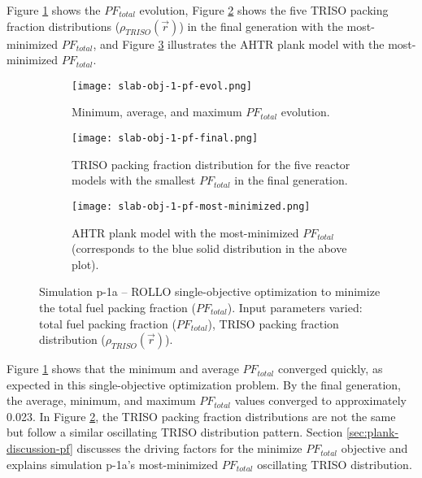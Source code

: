 Figure \ref{fig:slab-obj-1-pf-evol} shows the $PF_{total}$ evolution,  
Figure \ref{fig:slab-obj-1-pf-final} shows the five TRISO packing fraction 
distributions ($\rho_{TRISO}(\vec{r})$) in the final generation with the 
most-minimized $PF_{total}$, and Figure \ref{fig:slab-obj-1-pf-most-minimized} 
illustrates the \gls{AHTR} plank model with the most-minimized $PF_{total}$.
\begin{figure}[htbp!]
    \centering
    \begin{subfigure}{0.9\textwidth}
        \texttt{[image: slab-obj-1-pf-evol.png]}
        \caption{Minimum, average, and maximum $PF_{total}$ evolution.}
        \label{fig:slab-obj-1-pf-evol} 
    \end{subfigure}
    \begin{subfigure}{0.9\textwidth}
        \texttt{[image: slab-obj-1-pf-final.png]}
        \caption{TRISO packing fraction distribution for the five reactor models with the 
        smallest $PF_{total}$ in the final generation.}
        \label{fig:slab-obj-1-pf-final} 
    \end{subfigure}
    \begin{subfigure}{0.9\textwidth}
        \texttt{[image: slab-obj-1-pf-most-minimized.png]}
        \caption{\gls{AHTR} plank model with the most-minimized $PF_{total}$ 
        (corresponds to the blue solid distribution in the above plot).}
        \label{fig:slab-obj-1-pf-most-minimized} 
    \end{subfigure}
    \caption{Simulation p-1a -- ROLLO single-objective optimization to minimize the 
    total fuel packing fraction ($PF_{total}$). 
    Input parameters varied: total fuel packing fraction 
    ($PF_{total}$), \gls{TRISO} packing fraction distribution ($\rho_{TRISO}(\vec{r})$).}
    \label{fig:slab-obj-1-pf}
\end{figure}

Figure \ref{fig:slab-obj-1-pf-evol} shows that the minimum and average $PF_{total}$ 
converged quickly, as expected in this single-objective optimization 
problem.
By the final generation, the average, minimum, and maximum $PF_{total}$
values converged to approximately 0.023. 
In Figure \ref{fig:slab-obj-1-pf-final}, the \gls{TRISO} packing fraction
distributions are not the same but follow a similar oscillating 
TRISO distribution pattern. 
Section \ref{sec:plank-discussion-pf} discusses the driving factors for the minimize 
$PF_{total}$ objective and explains simulation p-1a's most-minimized $PF_{total}$ 
oscillating TRISO distribution. 

